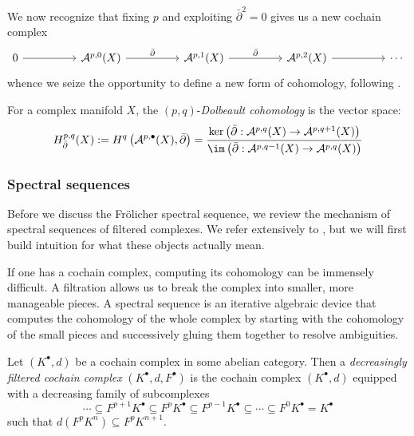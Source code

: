 \noindent We now recognize that fixing $p$ and exploiting $\bar\partial^2=0$ gives us a new cochain complex
\[\begin{tikzcd}
	0 && {\mathcal{A}^{p,0}(X)} && {\mathcal{A}^{p,1}(X)} && {\mathcal{A}^{p,2}(X)} && \cdots
	\arrow[from=1-1, to=1-3]
	\arrow["{\bar\partial}", from=1-3, to=1-5]
	\arrow["{\bar\partial}", from=1-5, to=1-7]
	\arrow[from=1-7, to=1-9]
\end{tikzcd}\]
whence we seize the opportunity to define a new form of cohomology, following \cite[Definition 2.6.20]{Huybrechts2005}.

\begin{definition}
    For a complex manifold $X$, the $(p,q)$-\emph{Dolbeault cohomology} is the vector space:
    $$
    H^{p,q}_{\bar\partial}(X) := H^q\left(\mathcal{A}^{p,\bullet}(X), \bar\partial\right) = \frac{\ker \left(\bar\partial:\mathcal{A}^{p,q}(X) \to \mathcal{A}^{p,q+1}(X)\right)}{\im \left(\bar\partial:\mathcal{A}^{p,q-1}(X) \to \mathcal{A}^{p,q}(X)\right)}
    $$
\end{definition}


\subsubsection{Spectral sequences}
Before we discuss the Fr\"olicher spectral sequence, we review the mechanism of spectral sequences of filtered complexes. We refer extensively to \cite[Chapters 8.3.1 and 8.3.2]{VoisinI2002}, but we will first build intuition for what these objects actually mean.

\medskip

\noindent If one has a cochain complex, computing its cohomology can be immensely difficult. A filtration allows us to break the complex into smaller, more manageable pieces. A spectral sequence is an iterative algebraic device that computes the cohomology of the whole complex by starting with the cohomology of the small pieces and successively gluing them together to resolve ambiguities.
\begin{definition}
    Let $\left(K^\bullet,d\right)$ be a cochain complex in some abelian category. Then a \emph{decreasingly filtered cochain complex} $\left(K^\bullet, d, F^\bullet\right)$ is the cochain complex $\left(K^\bullet, d\right)$ equipped with a decreasing family of subcomplexes
    $$
    \cdots \subseteq F^{p+1} K^\bullet \subseteq F^p K^\bullet \subseteq F^{p-1} K^\bullet \subseteq \cdots \subseteq F^0K^\bullet  = K^\bullet
    $$
    such that $d\left(F^pK^n\right)\subseteq F^pK^{n+1}$. 
\end{definition}

